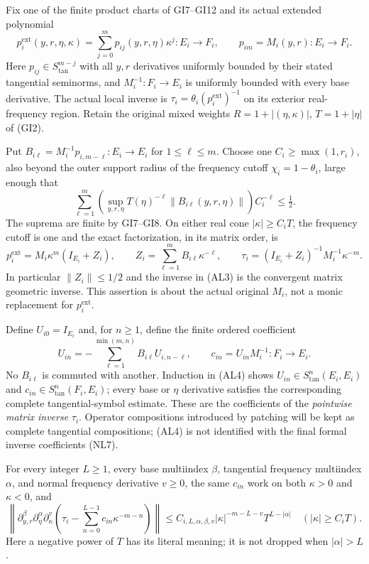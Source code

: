\documentclass[
  11pt,
]{article}
\begin{document}
Fix one of the finite product charts of GI7--GI12 and its actual
extended polynomial \[
 p_i^{\mathrm{ext}}(y,r,\eta,\kappa)
 =\sum_{j=0}^{m}p_{ij}(y,r,\eta)\kappa^j:E_i\longrightarrow F_i,
 \qquad p_{im}=M_i(y,r):E_i\longrightarrow F_i .
 \tag{AL1}
\] Here \(p_{ij}\in S_{\mathrm{tan}}^{m-j}\) with all \(y,r\)
derivatives uniformly bounded by their stated tangential seminorms, and
\(M_i^{-1}:F_i\to E_i\) is uniformly bounded with every base derivative.
The actual local inverse is \(\tau_i=\theta_i(p_i^{\mathrm{ext}})^{-1}\)
on its exterior real-frequency region. Retain the original mixed weights
\(R=1+|(\eta,\kappa)|\), \(T=1+|\eta|\) of (GI2).

Put \(B_{i\ell}=M_i^{-1}p_{i,m-\ell}:E_i\to E_i\) for
\(1\leq\ell\leq m\). Choose one \(C_i\geq\max(1,r_i)\), also beyond the
outer support radius of the frequency cutoff \(\chi_i=1-\theta_i\),
large enough that \[
 \sum_{\ell=1}^m
 \left(\sup_{y,r,\eta}T(\eta)^{-\ell}\|B_{i\ell}(y,r,\eta)\|\right)C_i^{-\ell}
 \leq\tfrac12 .
 \tag{AL2}
\] The suprema are finite by GI7--GI8. On either real cone
\(|\kappa|\geq C_iT\), the frequency cutoff is one and the exact
factorization, in its matrix order, is \[
 p_i^{\mathrm{ext}}
 =M_i\kappa^m(I_{E_i}+Z_i),\qquad
 Z_i=\sum_{\ell=1}^m B_{i\ell}\kappa^{-\ell},\qquad
 \tau_i=(I_{E_i}+Z_i)^{-1}M_i^{-1}\kappa^{-m}.
 \tag{AL3}
\] In particular \(\|Z_i\|\leq1/2\) and the inverse in (AL3) is the
convergent matrix geometric inverse. This assertion is about the actual
original \(M_i\), not a monic replacement for \(p_i^{\mathrm{ext}}\).

Define \(U_{i0}=I_{E_i}\) and, for \(n\geq1\), define the finite ordered
coefficient \[
 U_{in}=-\sum_{\ell=1}^{\min(m,n)}B_{i\ell}U_{i,n-\ell},
 \qquad c_{in}=U_{in}M_i^{-1}:F_i\to E_i .
 \tag{AL4}
\] No \(B_{i\ell}\) is commuted with another. Induction in (AL4) shows
\(U_{in}\in S_{\mathrm{tan}}^n(E_i,E_i)\) and
\(c_{in}\in S_{\mathrm{tan}}^n(F_i,E_i)\); every base or \(\eta\)
derivative satisfies the corresponding complete tangential-symbol
estimate. These are the coefficients of the \emph{pointwise matrix
inverse} \(\tau_i\). Operator compositions introduced by patching will
be kept as complete tangential compositions; (AL4) is not identified
with the final formal inverse coefficients (NL7).

For every integer \(L\geq1\), every base multiindex \(\beta\),
tangential frequency multiindex \(\alpha\), and normal frequency
derivative \(v\geq0\), the same \(c_{in}\) work on both \(\kappa>0\) and
\(\kappa<0\), and \[
 \left\|\partial_{y,r}^{\beta}\partial_\eta^\alpha
 \partial_\kappa^v
 \left(\tau_i-\sum_{n=0}^{L-1}c_{in}\kappa^{-m-n}\right)\right\|
 \leq C_{i,L,\alpha,\beta,v}
 |\kappa|^{-m-L-v}T^{L-|\alpha|}
 \quad (|\kappa|\geq C_iT).
 \tag{AL5}
\] Here a negative power of \(T\) has its literal meaning; it is not
dropped when \(|\alpha|>L\).
\end{document}
